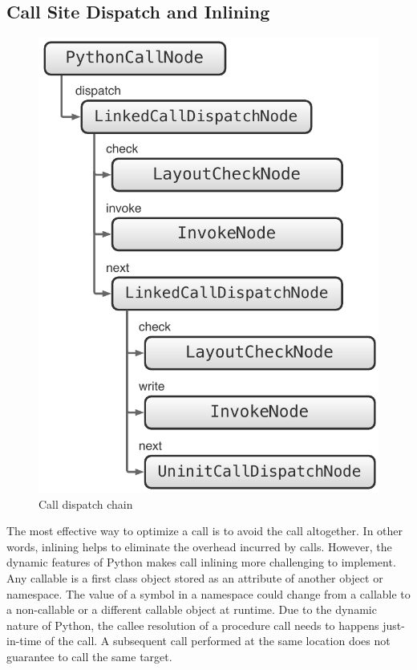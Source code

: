 \subsection{Call Site Dispatch and Inlining}
\label{sec:ch5-call-site-caching-and-inlining}

\begin{figure}
\centering
\includegraphics[scale=.5]{figures/ch5-call-dispatch-chain}
\caption{Call dispatch chain}
\label{fig:ch5-call-dispatch-chain}
\end{figure}

The most effective way to optimize a call is to avoid the call altogether.
In other words, inlining helps to eliminate the overhead incurred by calls.
However, the dynamic features of Python makes call inlining more challenging to implement.
Any callable is a first class object stored as an attribute of another object or namespace.
The value of a symbol in a namespace could change from a callable to a non-callable or a different callable object at runtime.
Due to the dynamic nature of Python, the callee resolution of a procedure call needs to happens just-in-time of the call.
A subsequent call performed at the same location does not guarantee to call the same target.

